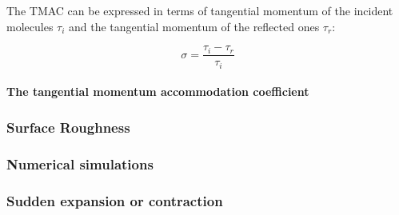 The TMAC can be expressed in terms of tangential momentum of the incident molecules $\tau_i$ and the tangential momentum of the reflected ones $\tau_r$:

$$
	\sigma = \frac{\tau_i - \tau_r}{\tau_i}
$$

\paragraph*{The tangential momentum accommodation coefficient}
\subsubsection*{Surface Roughness}

\subsubsection*{Numerical simulations}

\subsubsection*{Sudden expansion or contraction}

